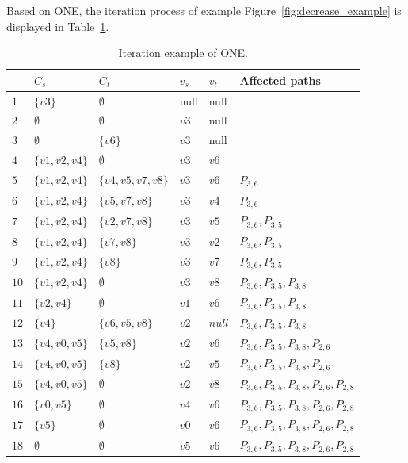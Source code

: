 Based on ONE, the iteration process of example Figure~\ref{fig:decrease_example} is displayed in Table~\ref{tab:algo2}.
\begin{table}[htbp]
	\centering
	\caption{Iteration example of ONE.}
	\begin{tabular}{|l|l|l|l|l|l|}
    \hline
     & $C_s$ & $C_t$ & $v_s$ & $v_t$ & Affected paths \\
    \hline
    $1$ & $\{v3\}$ 		  & $\emptyset$ 	  & null & null &  \\
    $2$ & $\emptyset$	  & $\emptyset$       & $v3$ & null &  \\
    $3$ & $\emptyset$  & $\{v6\}$          & $v3$ & null &  \\
	$4$ & $\{v1,v2,v4\}$  & $\emptyset$ 	  & $v3$ & $v6$ &  \\
    $5$ & $\{v1,v2,v4\}$  & $\{v4,v5,v7,v8\}$ & $v3$ & $v6$ & $P_{3,6}$ \\
    $6$ & $\{v1,v2,v4\}$  & $\{v5,v7,v8\}$    & $v3$ & $v4$ & $P_{3,6}$ \\
    $7$ & $\{v1,v2,v4\}$  & $\{v2,v7,v8\}$ 	  & $v3$ & $v5$ & $P_{3,6},P_{3,5}$ \\
    $8$ & $\{v1,v2,v4\}$  & $\{v7,v8\}$ 	  & $v3$ & $v2$ & $P_{3,6},P_{3,5}$ \\
    $9$ & $\{v1,v2,v4\}$ & $\{v8\}$ 		  & $v3$ & $v7$ & $P_{3,6},P_{3,5}$ \\
    $10$ & $\{v1,v2,v4\}$ & $\emptyset$ 	  & $v3$ & $v8$ & $P_{3,6},P_{3,5},P_{3,8}$ \\
    $11$ & $\{v2,v4\}$ 	  & $\emptyset$ 	  & $v1$ & $v6$ & $P_{3,6},P_{3,5},P_{3,8}$ \\
    $12$ & $\{v4\}$		  & $\{v6,v5,v8\}$ 	  & $v2$ & $null$ & $P_{3,6},P_{3,5},P_{3,8}$ \\
    $13$ & $\{v4,v0,v5\}$		  & $\{v5,v8\}$ 	      & $v2$ & $v6$ & $P_{3,6},P_{3,5},P_{3,8},P_{2,6}$ \\
    $14$ & $\{v4,v0,v5\}$		  & $\{v8\}$ 	      & $v2$ & $v5$ & $P_{3,6},P_{3,5},P_{3,8},P_{2,6}$ \\
    $15$ & $\{v4,v0,v5\}$		  & $\emptyset$ 	  & $v2$ & $v8$ & $P_{3,6},P_{3,5},P_{3,8},P_{2,6},P_{2,8}$ \\
    $16$ & $\{v0,v5\}$ 	  & $\emptyset$ 	  & $v4$ & $v6$ & $P_{3,6},P_{3,5},P_{3,8},P_{2,6},P_{2,8}$\\
    $17$ & $\{v5\}$ 	  & $\emptyset$ 	  & $v0$ & $v6$ & $P_{3,6},P_{3,5},P_{3,8},P_{2,6},P_{2,8}$\\
    $18$ & $\emptyset$ 	  & $\emptyset$ 	  & $v5$ & $v6$ & $P_{3,6},P_{3,5},P_{3,8},P_{2,6},P_{2,8}$ \\
    \hline
    \end{tabular}
    \label{tab:algo2}
\end{table}

